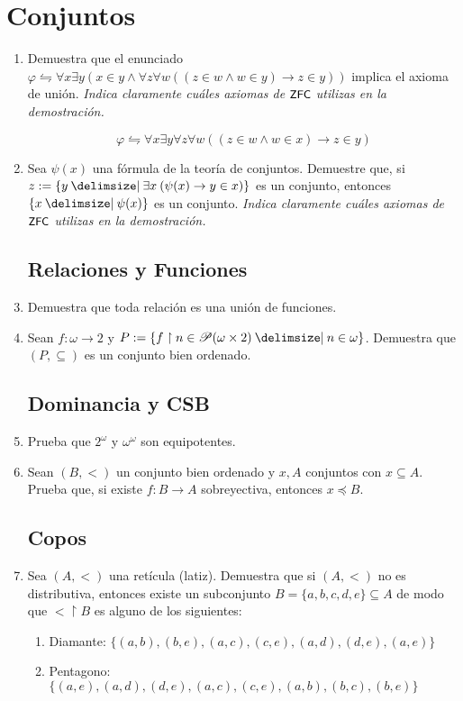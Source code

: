 \documentclass[11pt]{article}
\providecommand\st{\;|\;}
\newcommand\SetSymbol[1][]{%
    \nonscript\:#1\vert
    \allowbreak
    \nonscript\:
    \mathopen{}}
\renewcommand\st{\SetSymbol[\delimsize]}
\renewcommand\st{\SetSymbol[\delimsize]}
\newcommand{\zfc}{\text{\textsf{\small ZFC}}}
\begin{document}
    
    \section*{Conjuntos}
    \begin{enumerate}[\bf\text{Ej.} 1.]

    \subsection*{Axiomas Básicos}
    \item Demuestra que el enunciado $\varphi \leftrightharpoons \forall x\exists y (x\in y \wedge \forall z \forall w ((z\in w \wedge w\in y) \rightarrow z\in y))$ implica el axioma de unión.
    \textit{Indica claramente cuáles axiomas de $\zfc$ utilizas en la demostración.}

    \[ \varphi \leftrightharpoons \forall x\exists y \forall z \forall w ((z\in w \wedge w\in x) \rightarrow z\in y) \]

    \item Sea $\psi(x)$ una fórmula de la teoría de conjuntos. Demuestre que, si $z:=\{ y \st \exists x \: (\psi(x) \to y \in x) \}$ es un conjunto, entonces $\{x \st \psi(x)\}$ es un conjunto.
    \textit{Indica claramente cuáles axiomas de $\zfc$ utilizas en la demostración.}

    \subsection*{Relaciones y Funciones}
    \item Demuestra que toda relación es una unión de funciones.
    \item Sean $f:\omega \to 2$ y $P:=\{ f \upharpoonright n \in \mathscr{P}(\omega \times 2) \st n \in \omega \}$. Demuestra que $(P,\subseteq)$ es un conjunto bien ordenado.
    
    \subsection*{Dominancia y CSB}
    \item Prueba que $2^\omega$ y $\omega ^ \omega$ son equipotentes.
    
    \item Sean $(B,<)$ un conjunto bien ordenado y $x,A$ conjuntos con $x \subseteq A$. Prueba que, si existe $f:B \to A$ sobreyectiva, entonces $x \preccurlyeq B$.
    
    \subsection*{Copos}
    \item Sea $(A,<)$ una retícula (latiz). Demuestra que si $(A,<)$ no es distributiva, entonces existe un subconjunto $B=\{a,b,c,d,e\} \subseteq A$ de modo que $< \upharpoonright B$ es alguno de los siguientes:
    \begin{enumerate}
        \item Diamante: $\{(a,b),(b,e),(a,c),(c,e),(a,d),(d,e),(a,e)\}$
        \item Pentagono: $\{(a,e),(a,d),(d,e),(a,c),(c,e),(a,b),(b,c),(b,e)\}$
    \end{enumerate}


\end{enumerate}
\end{document}
